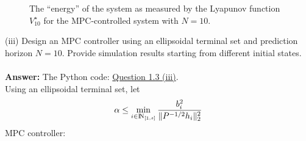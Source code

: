 \documentclass[a4paper,11pt,reqno]{amsart}
\newcommand{\N}{{\rm I\!N}}
\begin{document}
\begin{figure}[H] %
    \raggedright
    \captionsetup{justification   = raggedright,
              singlelinecheck = false}
    \caption{The ``energy'' of the system as measured by the Lyapunov function $V^{\star}_{10}$ for the MPC-controlled system with $N = 10$.}
    \label{fig:q3_ii_cost}
\end{figure}
\noindent(iii) Design an MPC controller using an ellipsoidal terminal set and prediction horizon $N=10$. Provide simulation results starting from different initial states.
\\ \\
\textbf{Answer:} 
The Python code: \href{https://github.com/Gczmy/ELE8088/blob/main/Coursework1/Python_code/3_iii.py}{Question 1.3 (iii)}.
\\
Using an ellipsoidal terminal set, let
\begin{equation}
    \alpha \leq \min_{i\in\N_{[1,s]}}\frac{b_i^2}{\|P^{-1/2}h_i\|_2^2}
\end{equation}
MPC controller:
\end{document}
